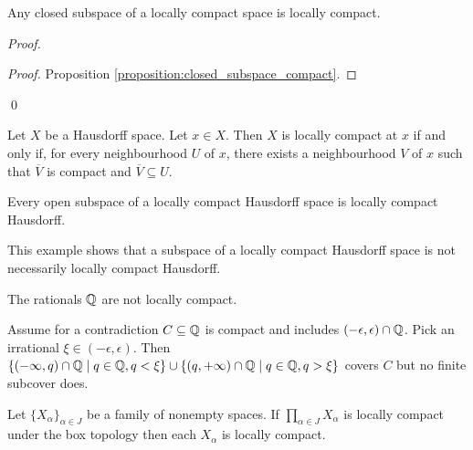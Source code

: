\begin{proposition}
    \label{proposition:closed_subspace_locally_compact}
    Any closed subspace of a locally compact space is locally compact.
\end{proposition}

\begin{proof}
    \pf
    \begin{proof}
        \pf Proposition \ref{proposition:closed_subspace_compact}.
    \end{proof}
    \qed
\end{proof}

\begin{proposition}
    \label{proposition:locally_compact_neighbourhood}
    Let $X$ be a Hausdorff space. Let $x \in X$. Then $X$ is locally compact at $x$ if and only if,
    for every neighbourhood $U$ of $x$, there exists a neighbourhood $V$ of $x$ such that
    $\overline{V}$ is compact and $\overline{V} \subseteq U$.
\end{proposition}

\begin{corollary}
    Every open subspace of a locally compact Hausdorff space is locally compact Hausdorff.
\end{corollary}

This example shows that a subspace of a locally compact Hausdorff space is not necessarily locally
compact Hausdorff.

\begin{example}
    The rationals $\mathbb{Q}$ are not locally compact.

    Assume for a contradiction $C \subseteq \mathbb{Q}$ is compact and includes $(-\epsilon, \epsilon)
    \cap \mathbb{Q}$. Pick an irrational $\xi \in (- \epsilon, \epsilon)$. Then $\{ (-\infty, q) \cap
    \mathbb{Q} \mid q \in \mathbb{Q}, q < \xi \} \cup \{ (q, +\infty) \cap
    \mathbb{Q} \mid q \in \mathbb{Q}, q > \xi \}$ covers $C$ but no finite subcover does.
\end{example}

\begin{proposition}
    Let $\{ X_\alpha \}_{\alpha \in J}$ be a family of nonempty spaces. If
    $\prod_{\alpha \in J} X_\alpha$ is locally compact under the box topology then each $X_\alpha$ is
    locally compact.
\end{proposition}

